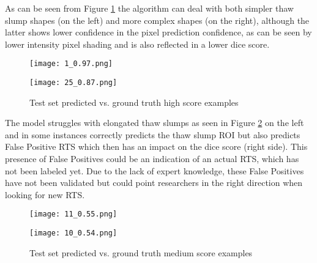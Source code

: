 As can be seen from Figure \ref{high_score_pic} the algorithm can deal with both simpler thaw slump shapes (on the left) and more complex shapes (on the right), although the latter shows lower confidence in the pixel prediction confidence, as can be seen by lower intensity pixel shading and is also reflected in a lower dice score.
    \begin{figure}[htp]
        \begin{minipage}[l][][c]{0.45\linewidth}
        \texttt{[image: 1\_0.97.png]}
        \end{minipage}
        \hfill
        \begin{minipage}[r][][c]{0.45\linewidth}
        \texttt{[image: 25\_0.87.png]}
        \end{minipage}
        \caption{Test set predicted vs. ground truth high score examples}\label{high_score_pic}
    \end{figure}

The model struggles with elongated thaw slumps as seen in Figure \ref{medium_score_pic} on the left and in some instances correctly predicts the thaw slump \gls{ROI} but also predicts False Positive \gls{RTS} which then has an impact on the dice score (right side). This presence of False Positives could be an indication of an actual \gls{RTS}, which has not been labeled yet. Due to the lack of expert knowledge, these False Positives have not been validated but could point researchers in the right direction when looking for new \gls{RTS}.
    \begin{figure}[htp]
        \begin{minipage}[c]{0.45\linewidth}
        \texttt{[image: 11\_0.55.png]}
        \end{minipage}
            \hfill
            \begin{minipage}[c]{0.45\linewidth}
            \texttt{[image: 10\_0.54.png]}
        \end{minipage}
        \caption{Test set predicted vs. ground truth medium score examples} \label{medium_score_pic}
    \end{figure}


